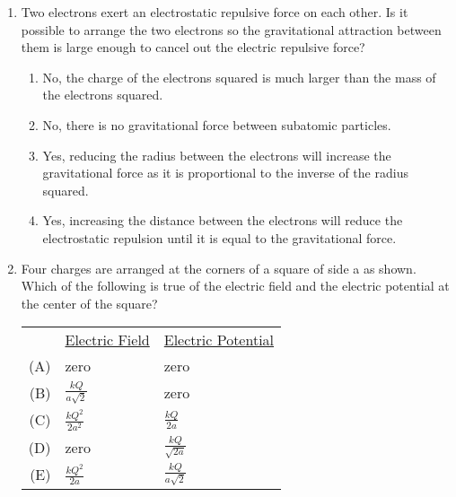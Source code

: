 \documentclass{../../../oss-apphys}
\begin{document}
\begin{multicols*}{2}
\begin{enumerate}[leftmargin=18pt]
   \item Two electrons exert an electrostatic repulsive force on each other. Is
     it possible to arrange the two electrons so the gravitational attraction
     between them is large enough to cancel out the electric repulsive force?
     \begin{enumerate}[nosep,leftmargin=18pt,label=(\Alph*)]
     \item  No, the charge of the electrons squared is much larger than the
       mass of the electrons squared.
     \item No, there is no gravitational force between subatomic particles.
     \item Yes, reducing the radius between the electrons will increase the
       gravitational force as it is proportional to the inverse of the radius
       squared.
     \item Yes, increasing the distance between the electrons will reduce the
       electrostatic repulsion until it is equal to the gravitational force.
     \end{enumerate}
     \vspace{.7in}
     
  \item Four charges are arranged at the corners of a square of side a as shown.
    Which of the following is true of the electric field and the electric
    potential at the center of the square?
    \begin{center}
    \end{center}
    \begin{tabular}{rll}
      & \underline{Electric Field} & \underline{Electric Potential}\\
      (A) & zero & zero \\
      (B) & $\frac{kQ}{a\sqrt{2}}$ & zero \\
      (C) & $\frac{kQ^2}{2a^2}$ &  $\frac{kQ}{2a}$\\
      (D) & zero &  $\frac{kQ}{\sqrt{2a}}$\\
      (E) & $\frac{kQ^2}{2a}$ & $\frac{kQ}{a\sqrt{2}}$
    \end{tabular}
    \vspace{.7in}
    \columnbreak
    

\end{enumerate}
\end{multicols*}
\end{document}
